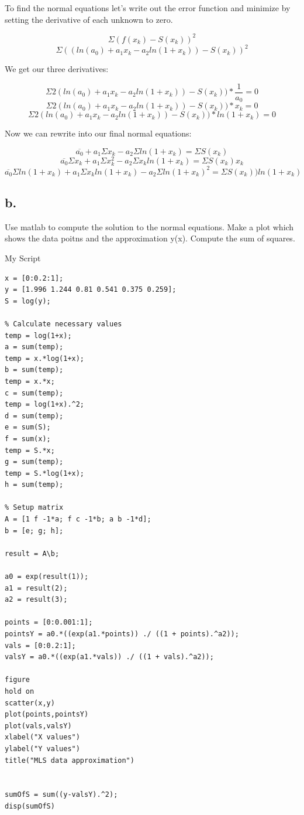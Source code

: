 \documentclass[]{article}
\begin{document}
To find the normal equations let's write out the error function and
minimize by setting the derivative of each unknown to zero.

\[\Sigma(f(x_k)-S(x_k))^2\]
\[\Sigma((ln(a_0) + a_1x_k - a_2ln(1+x_k))-S(x_k))^2\]

We get our three derivatives:

\[\Sigma2(ln(a_0) + a_1x_k - a_2ln(1+x_k))-S(x_k))*\frac1{a_0}=0\]
\[\Sigma2(ln(a_0) + a_1x_k - a_2ln(1+x_k))-S(x_k))*x_k = 0\]
\[\Sigma2(ln(a_0) + a_1x_k - a_2ln(1+x_k))-S(x_k))*ln(1+x_k)=0\]

Now we can rewrite into our final normal equations:

\[\overline{a_0} + a_1\Sigma x_k - a_2\Sigma ln(1+x_k)= \Sigma S(x_k)\]
\[\overline{a_0}\Sigma x_k + a_1\Sigma x_k^2 - a_2\Sigma x_kln(1+x_k)=\Sigma S(x_k)x_k\]
\[\overline{a_0}\Sigma ln(1+x_k) + a_1\Sigma x_kln(1+x_k) - a_2\Sigma ln(1+x_k)^2=\Sigma S(x_k))ln(1+x_k)\]

\subsection{b.}\label{b.-2}

Use matlab to compute the solution to the normal equations. Make a plot
which shows the data poitns and the approximation y(x). Compute the sum
of squares.

My Script

\begin{verbatim}
x = [0:0.2:1];
y = [1.996 1.244 0.81 0.541 0.375 0.259];
S = log(y);

% Calculate necessary values
temp = log(1+x);
a = sum(temp);
temp = x.*log(1+x);
b = sum(temp);
temp = x.*x;
c = sum(temp);
temp = log(1+x).^2;
d = sum(temp);
e = sum(S);
f = sum(x);
temp = S.*x;
g = sum(temp);
temp = S.*log(1+x);
h = sum(temp);

% Setup matrix
A = [1 f -1*a; f c -1*b; a b -1*d];
b = [e; g; h];

result = A\b;

a0 = exp(result(1));
a1 = result(2);
a2 = result(3);

points = [0:0.001:1];
pointsY = a0.*((exp(a1.*points)) ./ ((1 + points).^a2));
vals = [0:0.2:1];
valsY = a0.*((exp(a1.*vals)) ./ ((1 + vals).^a2));

figure
hold on
scatter(x,y)
plot(points,pointsY)
plot(vals,valsY)
xlabel("X values")
ylabel("Y values")
title("MLS data approximation")


sumOfS = sum((y-valsY).^2);
disp(sumOfS)
\end{verbatim}
\end{document}
